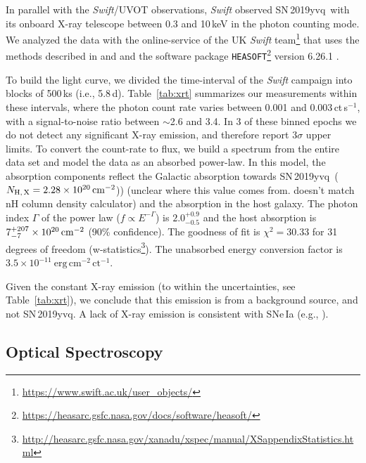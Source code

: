 \documentclass[twocolumn]{aastex63}
\newcommand{\sn}{SN\,2019yvq}
\begin{document}
In parallel with the \textit{Swift}/UVOT observations, \textit{Swift} observed
\sn\ with its onboard X-ray telescope \citep[XRT;][]{Burrows05} between 0.3
and 10\,keV in the photon counting mode. We analyzed the data with the
online-service of the UK \textit{Swift}
team\footnote{\href{https://www.swift.ac.uk/user_objects/}{\url{https://www.swift.ac.uk/user_objects/}}} that uses the methods described in \citet{Evans07}
and \citet{Evans09} and the software package \texttt{HEASOFT}\footnote{
\href{https://heasarc.gsfc.nasa.gov/docs/software/heasoft/}{\url{https://heasarc.gsfc.nasa.gov/docs/software/heasoft/}}} version 6.26.1 \citep{Heasarc}.



To build the light curve, we divided the time-interval of the \textit{Swift}
campaign into blocks of 500\,ks (i.e., 5.8\,d). Table~\ref{tab:xrt} summarizes
our measurements within these intervals, where the photon count rate varies
between 0.001 and 0.003\,ct\,s$^{-1}$, with a signal-to-noise ratio between
$\sim$2.6 and 3.4. In 3 of these binned epochs we do not detect any
significant X-ray emission, and therefore report $3\sigma$ upper limits. To
convert the count-rate to flux, we build a spectrum from the entire data set
and model the data as an absorbed power-law. In this model, the absorption
components reflect the Galactic absorption towards \sn\ ($N_{\rm
H,\,X}=2.28\times10^{20}\,{\rm cm}^{-2}$)) (unclear where this value comes
from. doesn't match nH column density calculator) and the absorption in the
host galaxy. The photon index $\Gamma$ of the power law ($f \propto
E^{-\Gamma}$) is $2.0^{+0.9}_{-0.5}$ and the host absorption is
$7^{+207}_{-7}\times10^{20}\,{\rm cm}^{-2}$ (90\% confidence). The goodness of
fit is $\chi^2=30.33$ for 31 degrees of freedom
(w-statistics\footnote{\href{http://heasarc.gsfc.nasa.gov/xanadu/xspec/manual/XSappendixStatistics.html}{\url{http://heasarc.gsfc.nasa.gov/xanadu/xspec/manual/XSappendixStatistics.html}}}). The unabsorbed energy conversion factor is
$3.5\times10^{-11}~\mathrm{erg\,cm}^{-2}\,\mathrm{ct}^{-1}$.

Given the constant X-ray emission (to within the uncertainties, see
Table~\ref{tab:xrt}), we conclude that this emission is from a background
source, and not \sn. A lack of X-ray emission is consistent with SNe\,Ia (e.g.,
\citealt{Margutti12}).

\subsection{Optical Spectroscopy}
\end{document}
